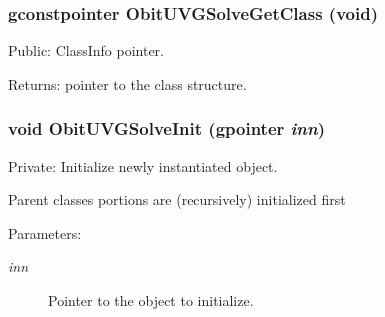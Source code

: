 \subsubsection{\setlength{\rightskip}{0pt plus 5cm}gconstpointer Obit\-UVGSolve\-Get\-Class (void)}\label{ObitUVGSolve_8c_a13}


Public: Class\-Info pointer. 

\begin{Desc}
\item[Returns:]pointer to the class structure. \end{Desc}
\subsubsection{\setlength{\rightskip}{0pt plus 5cm}void Obit\-UVGSolve\-Init (gpointer {\em inn})}\label{ObitUVGSolve_8c_a3}


Private: Initialize newly instantiated object. 

Parent classes portions are (recursively) initialized first \begin{Desc}
\item[Parameters:]
\begin{description}
\item[{\em inn}]Pointer to the object to initialize. \end{description}
\end{Desc}
